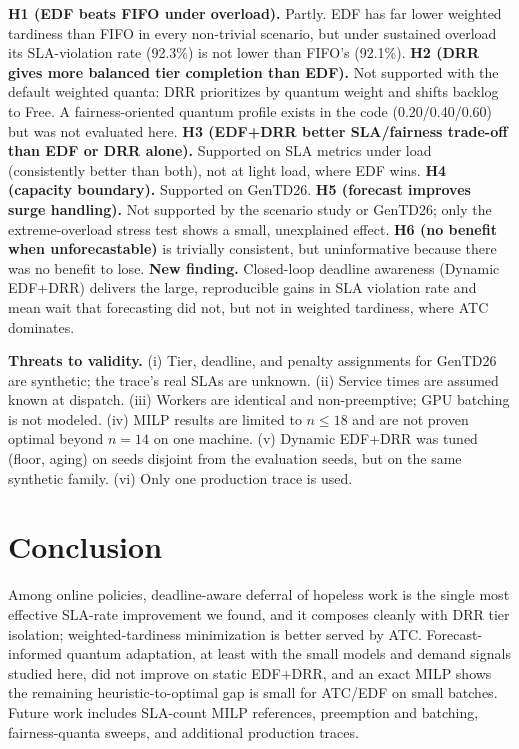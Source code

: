 \documentclass[conference]{IEEEtran}
\begin{document}
\textbf{H1 (EDF beats FIFO under overload).} Partly. EDF has far lower weighted tardiness than FIFO in every non-trivial scenario, but under sustained overload its SLA-violation rate (92.3\%) is not lower than FIFO's (92.1\%).
\textbf{H2 (DRR gives more balanced tier completion than EDF).} Not supported with the default weighted quanta: DRR prioritizes by quantum weight and shifts backlog to Free. A fairness-oriented quantum profile exists in the code (0.20/0.40/0.60) but was not evaluated here.
\textbf{H3 (EDF+DRR better SLA/fairness trade-off than EDF or DRR alone).} Supported on SLA metrics under load (consistently better than both), not at light load, where EDF wins.
\textbf{H4 (capacity boundary).} Supported on GenTD26.
\textbf{H5 (forecast improves surge handling).} Not supported by the scenario study or GenTD26; only the extreme-overload stress test shows a small, unexplained effect. \textbf{H6 (no benefit when unforecastable)} is trivially consistent, but uninformative because there was no benefit to lose.
\textbf{New finding.} Closed-loop deadline awareness (Dynamic EDF+DRR) delivers the large, reproducible gains in SLA violation rate and mean wait that forecasting did not, but not in weighted tardiness, where ATC dominates.

\textbf{Threats to validity.} (i) Tier, deadline, and penalty assignments for GenTD26 are synthetic; the trace's real SLAs are unknown. (ii) Service times are assumed known at dispatch. (iii) Workers are identical and non-preemptive; GPU batching is not modeled. (iv) MILP results are limited to $n\le18$ and are not proven optimal beyond $n=14$ on one machine. (v) Dynamic EDF+DRR was tuned (floor, aging) on seeds disjoint from the evaluation seeds, but on the same synthetic family. (vi) Only one production trace is used.

\section{Conclusion}

Among online policies, deadline-aware deferral of hopeless work is the single most effective SLA-rate improvement we found, and it composes cleanly with DRR tier isolation; weighted-tardiness minimization is better served by ATC. Forecast-informed quantum adaptation, at least with the small models and demand signals studied here, did not improve on static EDF+DRR, and an exact MILP shows the remaining heuristic-to-optimal gap is small for ATC/EDF on small batches. Future work includes SLA-count MILP references, preemption and batching, fairness-quanta sweeps, and additional production traces.
\end{document}
